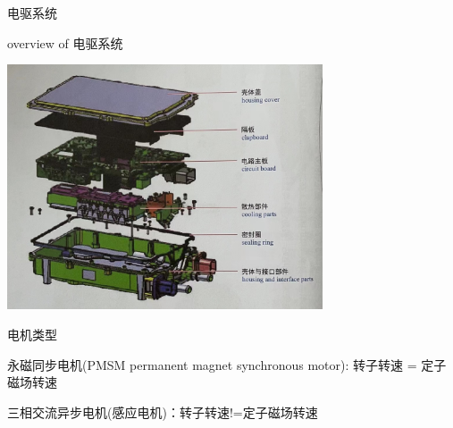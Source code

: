 \begin{frame}
	\begin{block}{电驱系统}
		\begin{compactitem}
			\item overview of 电驱系统
			\begin{center}
				\includegraphics[width=0.7\textwidth]{2-51}
			\end{center}
		\end{compactitem}
	\end{block}
\end{frame}
\begin{frame}
	\begin{block}{}
		\begin{compactitem}
			\item 电机类型
				\begin{compactenum}
					\item 永磁同步电机(PMSM permanent magnet synchronous motor): 转子转速 = 定子磁场转速
					\item 三相交流异步电机(感应电机)：转子转速!=定子磁场转速
				\end{compactenum}
		\end{compactitem}
						\begin{figure}[htbp]
		\centering
	\end{figure}
	\end{block}
\end{frame}
